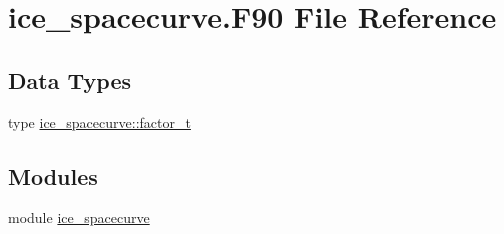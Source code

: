 \hypertarget{ice__spacecurve_8F90}{
\section{ice\_\-spacecurve.F90 File Reference}
\label{ice__spacecurve_8F90}
}
\subsection*{Data Types}
\begin{DoxyCompactItemize}
\item 
type \hyperlink{typeice__spacecurve_1_1factor__t}{ice\_\-spacecurve::factor\_\-t}
\end{DoxyCompactItemize}
\subsection*{Modules}
\begin{DoxyCompactItemize}
\item 
module \hyperlink{namespaceice__spacecurve}{ice\_\-spacecurve}
\end{DoxyCompactItemize}
